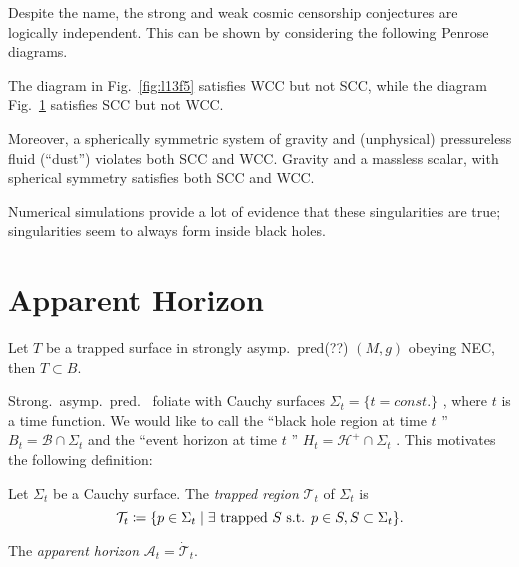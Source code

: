 Despite the name, the strong and weak cosmic censorship conjectures are logically independent.
This can be shown by considering the following Penrose diagrams.
\begin{figure}[tbhp]
  \centering
  \begin{minipage}[t]{0.5\columnwidth}
    \centering
    \def\svgwidth{0.8\columnwidth}
    
    \caption{}
    \label{fig:l13f5}
  \end{minipage}%
  \begin{minipage}[t]{0.5\columnwidth}
    \centering
    \def\svgwidth{0.7\columnwidth}
    
    \caption{}
    \label{fig:l13f6}
  \end{minipage}
\end{figure}
The diagram in Fig.~\ref{fig:l13f5} satisfies WCC but not SCC, while the diagram Fig.~\ref{fig:l13f6} satisfies SCC but not WCC.

Moreover, a spherically symmetric system of gravity and (unphysical) pressureless fluid (``dust'') violates both SCC and WCC.
Gravity and a massless scalar, with spherical symmetry satisfies both SCC and WCC.

Numerical simulations provide a lot of evidence that these singularities are true; singularities seem to always form inside black holes.

\section{Apparent Horizon}%
\label{sec:apparent_horizon}

\begin{theorem}[]
  Let $T$ be a trapped surface in strongly asymp.~pred(??) $(M, g)$ obeying NEC, then $T \subset B$.
\end{theorem}

Strong.~asymp.~pred.~ foliate with Cauchy surfaces $\Sigma_t = \{t = const.\}$ , where $t$  is a time function.
We would like to call the ``black hole region at time $t$ '' $B_t = \mathcal{B} \cap \Sigma_t$  and the ``event horizon at time $t$ '' $H_t = \mathcal{H}^+ \cap \Sigma_t$ .
This motivates the following definition:
\begin{definition}
  Let $\Sigma_t$ be a Cauchy surface. The \emph{trapped region} $\mathcal{T}_t$ of $\Sigma_t$ is
  \begin{equation}
    \mathcal{T}_t \coloneqq \{p \in \Sigma_t \suchthat \exists \text{ trapped } S \text{ s.t. } p \in S, S \subset \Sigma_t\}.
  \end{equation}
\end{definition}
\begin{definition}[]
  The \emph{apparent horizon} $\mathcal{A}_t = \dot{\mathcal{T}}_t$.
\end{definition}

